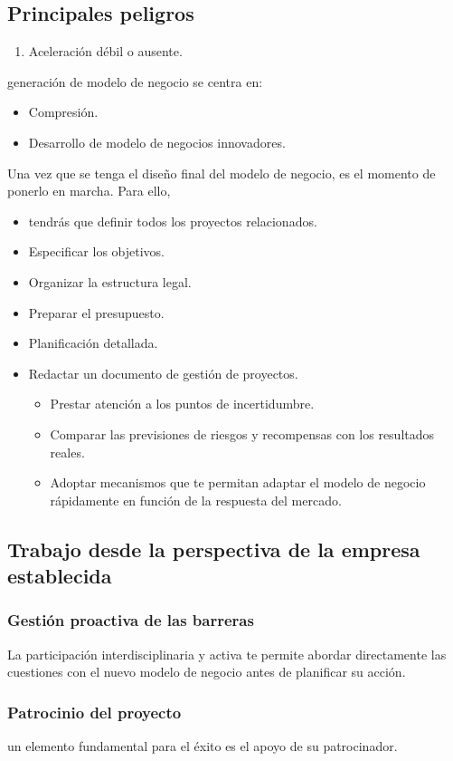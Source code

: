 \documentclass[11pt]{book}
\begin{document}
\subsection{Principales peligros}
\begin{enumerate}
\item Aceleración débil o ausente.
\end{enumerate}
generación de modelo de negocio se centra en:
\begin{itemize}
\item Compresión.
\item Desarrollo de modelo de negocios innovadores.
\end{itemize}
Una vez que se tenga el diseño final del modelo de negocio, es el momento de ponerlo en marcha. Para ello,  
\begin{itemize}
\item tendrás que definir todos los proyectos relacionados.
\item Especificar los objetivos.
\item Organizar la estructura legal.
\item Preparar el presupuesto.
\item Planificación detallada.
\item Redactar un documento de gestión de proyectos.
\begin{itemize}
\item Prestar atención a los puntos de incertidumbre.
\item Comparar las previsiones de riesgos y recompensas con los resultados reales.
\item Adoptar mecanismos que te permitan adaptar el modelo de negocio rápidamente en función de la respuesta del mercado.
\end{itemize}
\end{itemize}
\subsection{Trabajo desde la perspectiva de la empresa establecida}
\subsubsection{Gestión proactiva de las barreras}
La participación interdisciplinaria y activa te permite abordar directamente las cuestiones con el nuevo modelo de negocio antes de planificar su acción.
\subsubsection{Patrocinio del proyecto}
un elemento fundamental para el éxito es el apoyo de su patrocinador.
\end{document}
